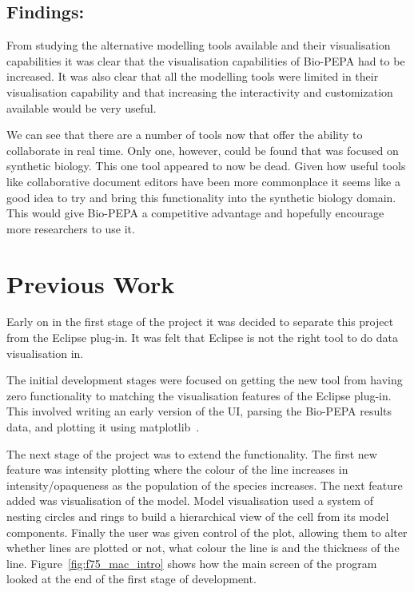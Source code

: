 \subsection{Findings:}

From studying the alternative modelling tools available and their visualisation capabilities it was clear that the visualisation capabilities of Bio-PEPA had to be increased.  It was also clear that all the modelling tools were limited in their visualisation capability and that increasing the interactivity and customization available would be very useful.

We can see that there are a number of tools now that offer the ability to collaborate in real time.  Only one, however, could be found that was focused on synthetic biology.  This one tool appeared to now be dead.  Given how useful tools like collaborative document editors have been more commonplace it seems like a good idea to try and bring this functionality into the synthetic biology domain.  This would give Bio-PEPA a competitive advantage and hopefully encourage more researchers to use it.

\section{Previous Work}

Early on in the first stage of the project it was decided to separate this project from the Eclipse plug-in.  It was felt that Eclipse is not the right tool to do data visualisation in.

The initial development stages were focused on getting the new tool from having zero functionality to matching the visualisation features of the Eclipse plug-in.  This involved writing an early version of the \ac{UI}, parsing the Bio-PEPA results data, and plotting it using matplotlib~\cite{mpl}.

The next stage of the project was to extend the functionality.  The first new feature was intensity plotting where the colour of the line increases in intensity/opaqueness as the population of the species increases.  The next feature added was visualisation of the model.  Model visualisation used a system of nesting circles and rings to build a hierarchical view of the cell from its model components.  Finally the user was given control of the plot, allowing them to alter whether lines are plotted or not, what colour the line is and the thickness of the line.  Figure~\ref{fig:f75_mac_intro} shows how the main screen of the program looked at the end of the first stage of development.


